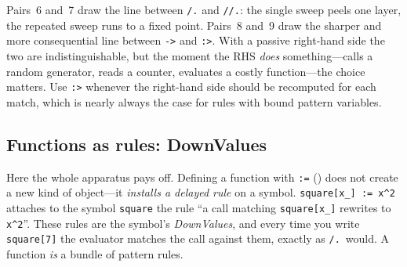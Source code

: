 Pairs~6 and~7 draw the line between \texttt{/.} and \texttt{//.}: the single
sweep peels one layer, the repeated sweep runs to a fixed point. Pairs~8 and~9
draw the sharper and more consequential line between \texttt{->} and
\texttt{:>}. With a passive right-hand side the
two are indistinguishable, but the moment the RHS \emph{does} something---calls a
random generator, reads a counter, evaluates a costly function---the choice
matters. Use \texttt{:>} whenever the right-hand side should be recomputed for
each match, which is nearly always the case for rules with bound pattern
variables.



\subsection{Functions as rules: DownValues}
\label{ssec:prog-downvalues}

Here the whole apparatus pays off. Defining a function with \texttt{:=}
() does not create a new kind of object---it \emph{installs a
delayed rule} on a symbol. \texttt{square[x\_] := x\^{}2} attaches to the symbol
\texttt{square} the rule ``a call matching \texttt{square[x\_]} rewrites to
\texttt{x\^{}2}''. These rules are the symbol's
\emph{DownValues}, and every time you write \texttt{square[7]}
the evaluator matches the call against them, exactly as \texttt{/.}\ would. A
function \emph{is} a bundle of pattern rules.

